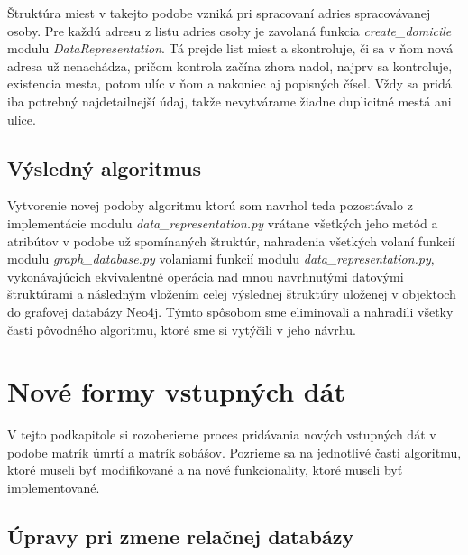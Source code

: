 Štruktúra miest v takejto podobe vzniká pri spracovaní adries spracovávanej osoby. Pre každú adresu z listu adries osoby je zavolaná funkcia \textit{create\_domicile} modulu \textit{DataRepresentation}. Tá prejde list miest a skontroluje, či sa v ňom nová adresa už nenachádza, pričom kontrola začína zhora nadol, najprv sa kontroluje, existencia mesta, potom ulíc v ňom a nakoniec aj popisných čísel. Vždy sa pridá iba potrebný najdetailnejší údaj, takže nevytvárame žiadne duplicitné mestá ani ulice.

\subsection{Výsledný algoritmus}

Vytvorenie novej podoby algoritmu ktorú som navrhol teda pozostávalo z implementácie modulu \textit{data\_representation.py} vrátane všetkých jeho metód a atribútov v podobe už spomínaných štruktúr, nahradenia všetkých volaní funkcií modulu \textit{graph\_database.py} volaniami funkcií modulu \textit{data\_representation.py}, vykonávajúcich ekvivalentné operácia nad mnou navrhnutými datovými štruktúrami a následným vložením celej výslednej štruktúry uloženej v objektoch do grafovej databázy Neo4j. Týmto spôsobom sme eliminovali a nahradili všetky časti pôvodného algoritmu, ktoré sme si vytýčili v jeho návrhu.


\section{Nové formy vstupných dát}

V tejto podkapitole si rozoberieme proces pridávania nových vstupných dát v podobe matrík úmrtí a matrík sobášov. Pozrieme sa na jednotlivé časti algoritmu, ktoré museli byť modifikované a na nové funkcionality, ktoré museli byť implementované.

\subsection{Úpravy pri zmene relačnej databázy}

